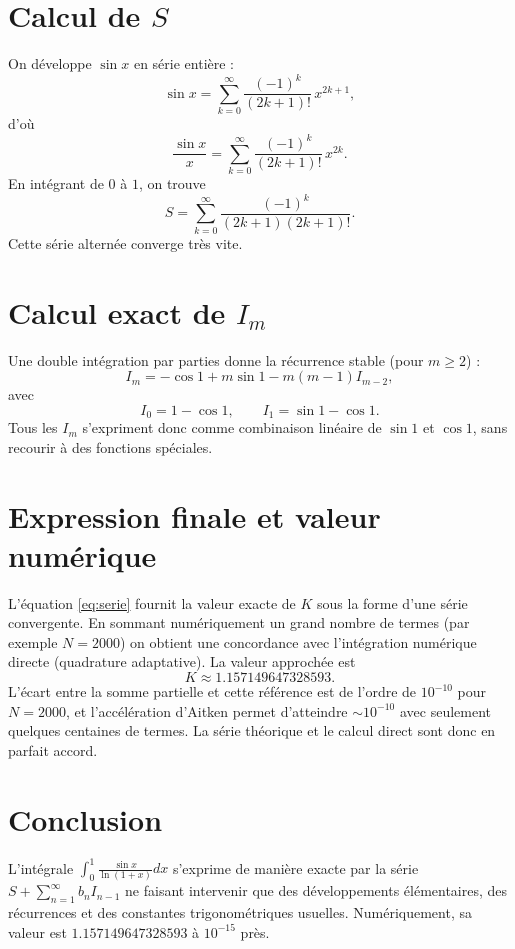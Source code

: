\documentclass[a4paper,12pt]{article}
\begin{document}
\section{Calcul de \(S\)}
On développe $\sin x$ en série entière :
\[
\sin x = \sum_{k=0}^{\infty}\frac{(-1)^{k}}{(2k+1)!}\,x^{2k+1},
\]
d'où
\[
\frac{\sin x}{x} = \sum_{k=0}^{\infty}\frac{(-1)^{k}}{(2k+1)!}\,x^{2k}.
\]
En intégrant de $0$ à $1$, on trouve
\[
S = \sum_{k=0}^{\infty}\frac{(-1)^{k}}{(2k+1)(2k+1)!}.
\]
Cette série alternée converge très vite.

\section{Calcul exact de \(I_m\)}
Une double intégration par parties donne la récurrence stable (pour $m\ge 2$) :
\[
I_m = -\cos1 + m\sin1 - m(m-1)I_{m-2},
\]
avec
\[
I_0 = 1-\cos1,\qquad I_1 = \sin1-\cos1.
\]
Tous les $I_m$ s'expriment donc comme combinaison linéaire de $\sin1$ et $\cos1$, sans recourir à des fonctions spéciales.

\section{Expression finale et valeur numérique}
L'équation \eqref{eq:serie} fournit la valeur exacte de $K$ sous la forme d'une série convergente. En sommant numériquement un grand nombre de termes (par exemple $N=2000$) on obtient une concordance avec l'intégration numérique directe (quadrature adaptative). La valeur approchée est
\[
\boxed{K \approx 1.157149647328593}.
\]
L'écart entre la somme partielle et cette référence est de l'ordre de $10^{-10}$ pour $N=2000$, et l'accélération d'Aitken permet d'atteindre $\sim 10^{-10}$ avec seulement quelques centaines de termes. La série théorique et le calcul direct sont donc en parfait accord.

\section{Conclusion}
L'intégrale \(\displaystyle \int_{0}^{1}\frac{\sin x}{\ln(1+x)}dx\) s'exprime de manière exacte par la série \(S+\sum_{n=1}^{\infty} b_n I_{n-1}\) ne faisant intervenir que des développements élémentaires, des récurrences et des constantes trigonométriques usuelles. Numériquement, sa valeur est \(1.157149647328593\) à \(10^{-15}\) près.
\end{document}
